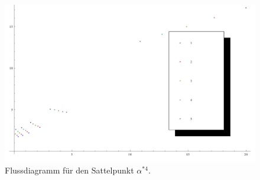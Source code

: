 \begin{figure}[h]
 \centering

 \includegraphics[scale = 0.5]{abschnitte/beta_QCDxdQCD/fig/Fix4_mit_Skalaren.pdf}

 \caption{Flussdiagramm für den Sattelpunkt $\alpha^{*4}$.}
 
 \label{fig:beta_QCDxdQCD:Fix4_mit_Skalaren}

 \end{figure}
